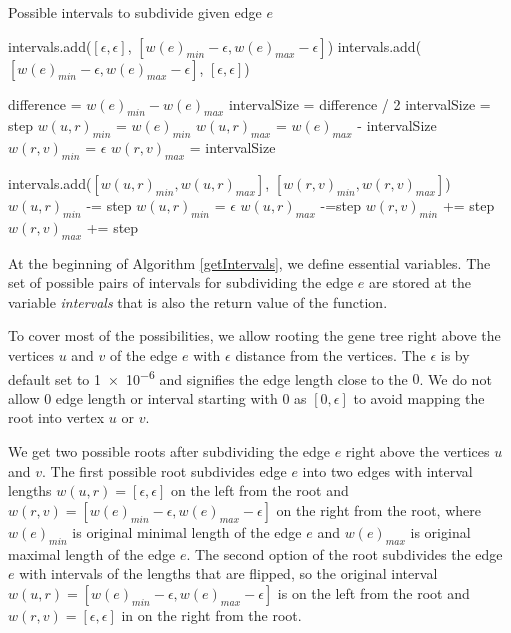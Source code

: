 \begin{algorithm}[!htbp]
\caption{Possible intervals to subdivide given edge $e$} 
\label{getIntervals}
\begin{algorithmic}[1]
	\State intervals.add($[ \epsilon, \epsilon ]$, $[ w(e)_{min}-\epsilon, w(e)_{max}-\epsilon ]$) 
	\State intervals.add($[ w(e)_{min}-\epsilon, w(e)_{max}-\epsilon ]$, $[ \epsilon, \epsilon ]$)

	\State difference = $w(e)_{min} - w(e)_{max}$
		\State intervalSize = difference / 2
	\Else
		\State intervalSize = step
	\EndIf
	\State $w(u,r)_{min}$ = $w(e)_{min}$
	\State $w(u,r)_{max}$ = $w(e)_{max}$ - intervalSize
	\State $w(r,v)_{min}$ = $\epsilon$
	\State $w(r,v)_{max}$ = intervalSize
	
		\State intervals.add($[w(u,r)_{min}, w(u,r)_{max}]$, $[w(r,v)_{min},w(r,v)_{max}]$)
		\State $w(u,r)_{min}$ -= step
			\State $w(u,r)_{min}$ = $\epsilon$
		\EndIf
		\State $w(u,r)_{max}$ -=step
		\State $w(r,v)_{min}$ += step
		\State $w(r,v)_{max}$ += step
	\EndWhile

	\EndIf
\EndFunction
\end{algorithmic}
\end{algorithm}

At the beginning of Algorithm \ref{getIntervals}, we define essential variables. The set of possible pairs of intervals for subdividing the edge $e$ are stored at the variable \emph{intervals} that is also the return value of the function.

To cover most of the possibilities, we allow rooting the gene tree right above the vertices $u$ and $v$ of the edge $e$ with $\epsilon$ distance from the vertices. The $\epsilon$ is by default set to \num{1e-6} and signifies the edge length close to the $0$. We do not allow $0$ edge length or interval starting with $0$ as $[0, \epsilon]$ to avoid mapping the root into vertex $u$ or $v$.

We get two possible roots after subdividing the edge $e$ right above the vertices $u$ and $v$. The first possible root subdivides edge $e$ into two edges with interval lengths $w(u, r) = [ \epsilon, \epsilon ]$ on the left from the root and $w(r, v) = [ w(e)_{min}-\epsilon, w(e)_{max}-\epsilon ]$ on the right from the root, where $w(e)_{min}$ is original minimal length of the edge $e$ and $w(e)_{max}$ is original maximal length of the edge $e$. The second option of the root subdivides the edge $e$ with intervals of the lengths that are flipped, so the original interval $w(u, r) = [ w(e)_{min}-\epsilon, w(e)_{max}-\epsilon ]$ is on the left from the root and $w(r, v) = [ \epsilon, \epsilon ]$ in on the right from the root.

